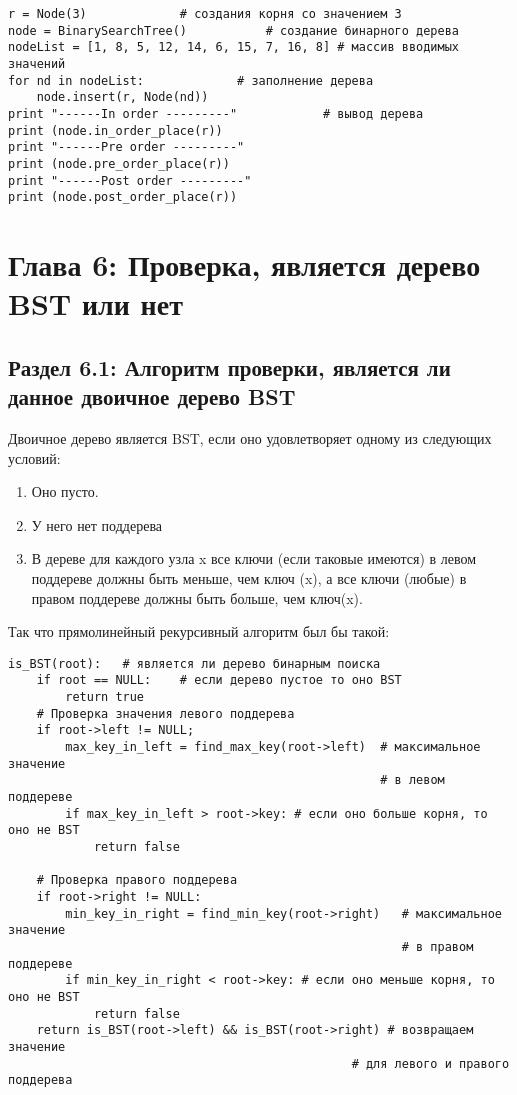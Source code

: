 \vspace{\baselineskip}
\begin{tcolorbox}
\begin{verbatim}
r = Node(3)				# создания корня со значением 3
node = BinarySearchTree()			# создание бинарного дерева
nodeList = [1, 8, 5, 12, 14, 6, 15, 7, 16, 8] # массив вводимых значений
for nd in nodeList:				# заполнение дерева
	node.insert(r, Node(nd))
print "------In order ---------"			# вывод дерева 
print (node.in_order_place(r))
print "------Pre order ---------"
print (node.pre_order_place(r))
print "------Post order ---------"
print (node.post_order_place(r))
\end{verbatim}
\end{tcolorbox}

\chapter*{Глава 6: Проверка, является дерево BST или нет}

\vspace{\baselineskip}
\section*{Раздел 6.1: Алгоритм проверки, является ли данное двоичное дерево BST}

\vspace{\baselineskip}
Двоичное дерево является BST, если оно удовлетворяет одному из следующих условий:

\begin{enumerate} 
	\item Оно пусто.
	\item У него нет поддерева
	\item В дереве для каждого узла x все ключи (если таковые имеются) в левом поддереве должны быть меньше, чем ключ (x), а все ключи (любые) в правом поддереве должны быть больше, чем ключ(x).
\end{enumerate}

Так что прямолинейный рекурсивный алгоритм был бы такой:

\vspace{\baselineskip}
\begin{tcolorbox}
\begin{verbatim}
is_BST(root): 	# является ли дерево бинарным поиска
	if root == NULL: 	# если дерево пустое то оно BST
		return true
	# Проверка значения левого поддерева
	if root->left != NULL;
		max_key_in_left = find_max_key(root->left)  # максимальное значение 
													# в левом поддереве
		if max_key_in_left > root->key: # если оно больше корня, то оно не BST
			return false

	# Проверка правого поддерева
	if root->right != NULL:
		min_key_in_right = find_min_key(root->right)   # максимальное значение 
													   # в правом поддереве
		if min_key_in_right < root->key: # если оно меньше корня, то оно не BST
			return false
	return is_BST(root->left) && is_BST(root->right) # возвращаем значение 
												# для левого и правого поддерева
\end{verbatim}
\end{tcolorbox}

